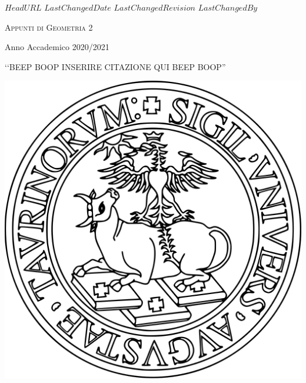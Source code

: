 \svnidlong
{$HeadURL$}
{$LastChangedDate$}
{$LastChangedRevision$}
{$LastChangedBy$}

\thispagestyle{titlepage}

\begin{center}
  \newlength{\parSepLength}
  \setlength{\parSepLength}{10ex}

  \Large
  \centering

  \thinRule\par
  \par\vspace{0.15\parSepLength}
  \begin{minipage}{\textwidth}
    \centering
    \fontsize{40pt}{36pt}\selectfont\titleColor\scshape
    Appunti di Geometria 2
  \end{minipage}
  \par\vspace{0.25\parSepLength}
  \par\thinRule

  \vspace{0.125\parSepLength}

  \begin{minipage}{\textwidth}
    \centering
    \small
    Anno Accademico 2020/2021
  \end{minipage}

  \vspace{0.225\parSepLength}
  
    \begin{minipage}{\textwidth}
  	\centering
  	‘‘BEEP BOOP INSERIRE CITAZIONE QUI BEEP BOOP''
  \end{minipage}

  \vfill

  \begin{minipage}{\textwidth}
    \centering
\begin{center}
	\includegraphics[width=0.25\linewidth]{images/Unito-logo}
\end{center}

  \end{minipage}


\end{center}
